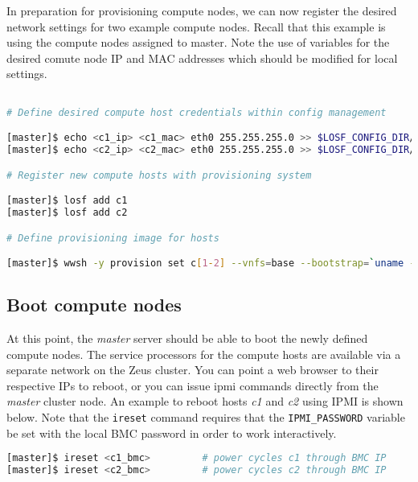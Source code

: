 \documentclass[letterpaper]{article}
\begin{document}

In preparation for provisioning compute nodes, we can now register the desired
network settings for two example compute nodes. Recall that this example is
using the compute nodes assigned to master. Note the use of variables for the
desired comute node IP and MAC addresses which should be modified for local settings. 

\begin{lstlisting}[language=bash,keywords={},upquote=true]

# Define desired compute host credentials within config management

[master]$ echo <c1_ip> <c1_mac> eth0 255.255.255.0 >> $LOSF_CONFIG_DIR/ips.cluster
[master]$ echo <c2_ip> <c2_mac> eth0 255.255.255.0 >> $LOSF_CONFIG_DIR/ips.cluster

# Register new compute hosts with provisioning system

[master]$ losf add c1
[master]$ losf add c2

# Define provisioning image for hosts

[master]$ wwsh -y provision set c[1-2] --vnfs=base --bootstrap=`uname -r`

\end{lstlisting}



\subsection{Boot compute nodes}

At this point, the {\em master} server should be able to boot the newly defined
compute nodes.  The service processors for the compute hosts are available via
a separate network on the Zeus cluster. You can point a web browser to their
respective IPs to reboot, or you can issue ipmi commands directly from the {\em
  master} cluster node.  An example to reboot hosts {\em c1} and {\em c2} using
IPMI is shown below.  Note that the \texttt{ireset} command requires that the
\texttt{IPMI\_PASSWORD} variable be set with the local BMC password in order to
work interactively.


\begin{lstlisting}[language=bash,keywords={},upquote=true]
[master]$ ireset <c1_bmc>         # power cycles c1 through BMC IP
[master]$ ireset <c2_bmc>         # power cycles c2 through BMC IP
\end{lstlisting} 
\end{document}
